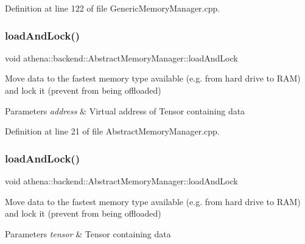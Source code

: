 Definition at line 122 of file Generic\+Memory\+Manager.\+cpp.

\mbox{\label{classathena_1_1backend_1_1generic_1_1_generic_memory_manager_a47ea5a77f81f91f803f748720c5c19b5}} 
\subsubsection{\texorpdfstring{load\+And\+Lock()}{loadAndLock()}\hspace{0.1cm}{\footnotesize\ttfamily [2/4]}}
{\footnotesize\ttfamily void athena\+::backend\+::\+Abstract\+Memory\+Manager\+::load\+And\+Lock}

Move data to the fastest memory type available (e.\+g. from hard drive to R\+AM) and lock it (prevent from being offloaded) 
\begin{DoxyParams}{Parameters}
{\em address} & Virtual address of Tensor containing data \\
\hline
\end{DoxyParams}


Definition at line 21 of file Abstract\+Memory\+Manager.\+cpp.

\mbox{\label{classathena_1_1backend_1_1generic_1_1_generic_memory_manager_a2bbfba2a5104aab3068d46214a6ae7df}} 
\subsubsection{\texorpdfstring{load\+And\+Lock()}{loadAndLock()}\hspace{0.1cm}{\footnotesize\ttfamily [3/4]}}
{\footnotesize\ttfamily void athena\+::backend\+::\+Abstract\+Memory\+Manager\+::load\+And\+Lock}

Move data to the fastest memory type available (e.\+g. from hard drive to R\+AM) and lock it (prevent from being offloaded) 
\begin{DoxyParams}{Parameters}
{\em tensor} & Tensor containing data \\
\hline
\end{DoxyParams}


